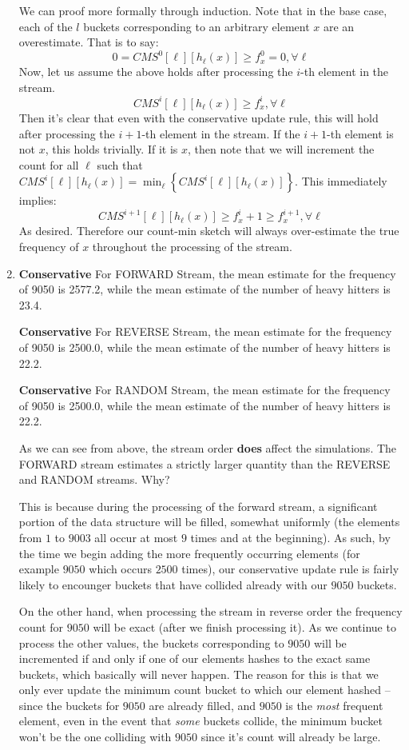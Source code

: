 \documentclass[12pt]{article}
\begin{document}
\begin{enumerate}[label=(\alph*)]
      We can proof more formally through induction. Note that in the base case, each of the $l$ buckets corresponding to an arbitrary element $x$ are an overestimate. That is to say:
      \[
        0 = CMS^0[\ell][h_{\ell}(x)] \geq f^0_x = 0, \forall \ell
      \]
      Now, let us assume the above holds after processing the $i$-th element in the stream. 
      \[
        CMS^i[\ell][h_{\ell}(x)] \geq f_x^i, \forall \ell
      \]
      Then it's clear that even with the conservative update rule, this will hold after processing the $i+1$-th element in the stream. If the $i+1$-th element is not $x$, this holds trivially. If it is $x$, then note that we will increment the count for all $\ell$ such that $CMS^i[\ell][h_{\ell}(x)] = \min_{\ell} \left\{ CMS^i[\ell][h_{\ell}(x)]\right\}$. This immediately implies:
      \[
        CMS^{i+1}[\ell][h_{\ell}(x)] \geq f_x^i + 1 \geq f_x^{i+1}, \forall \ell
      \]
      As desired. Therefore our count-min sketch will always over-estimate the true frequency of $x$ throughout the processing of the stream. 
  
  \item 
    \textbf{Conservative} For FORWARD Stream, the mean estimate for the frequency of 9050 is 2577.2, while the mean estimate of the number of heavy hitters is 23.4.
  
    \textbf{Conservative} For REVERSE Stream, the mean estimate for the frequency of 9050 is 2500.0, while the mean estimate of the number of heavy hitters is 22.2.
    
    \textbf{Conservative} For RANDOM Stream, the mean estimate for the frequency of 9050 is 2500.0, while the mean estimate of the number of heavy hitters is 22.2.

    As we can see from above, the stream order \textbf{does} affect the simulations. The FORWARD stream estimates a strictly larger quantity than the REVERSE and RANDOM streams. Why?

    This is because during the processing of the forward stream, a significant portion of the data structure will be filled, somewhat uniformly (the elements from $1$ to $9003$ all occur at most $9$ times and at the beginning). As such, by the time we begin adding the more frequently occurring elements (for example $9050$ which occurs $2500$ times), our conservative update rule is fairly likely to encounger buckets that have collided already with our $9050$ buckets.

    On the other hand, when processing the stream in reverse order the frequency count for $9050$ will be exact (after we finish processing it). As we continue to process the other values, the buckets corresponding to $9050$ will be incremented if and only if one of our elements hashes to the exact same buckets, which basically will never happen. The reason for this is that we only ever update the minimum count bucket to which our element hashed -- since the buckets for $9050$ are already filled, and $9050$ is the \textit{most} frequent element, even in the event that \textit{some} buckets collide, the minimum bucket won't be the one colliding with $9050$ since it's count will already be large.



\end{enumerate}
\end{document}
